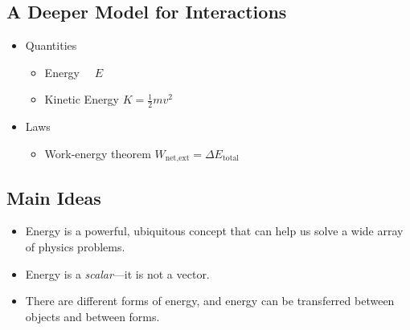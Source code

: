 \documentclass[]{article}
\begin{document}
\newpage
\begin{TeacherMargin}

\end{TeacherMargin}
\begin{PresentSpace}
\vspace{-10pt}
\section*{A Deeper Model for Interactions}
\vspace{-10pt}
\begin{itemize}
	\item Quantities
	\begin{itemize}
		\item Energy \qquad \qquad \qquad \quad \ \ $E$
		\item Kinetic Energy \qquad \qquad $K=\frac{1}{2}mv^{2}$
	\end{itemize}
	\item Laws
	\begin{itemize}
		\item Work-energy theorem \quad $W_{\text{net,ext}} = \Delta E_{\text{total}}$
	\end{itemize}
\end{itemize}
\end{PresentSpace}
\newpage
\begin{TeacherMargin}
	
\end{TeacherMargin}
\begin{PresentSpace}
\section*{Main Ideas}
\begin{itemize}
	\item Energy is a powerful, ubiquitous concept that can help us solve a wide array of physics problems.
	\item Energy is a \textit{scalar}---it is not a vector.
	\item There are different forms of energy, and energy can be transferred between objects and between forms.
\end{itemize}
\end{PresentSpace}
\end{document}
